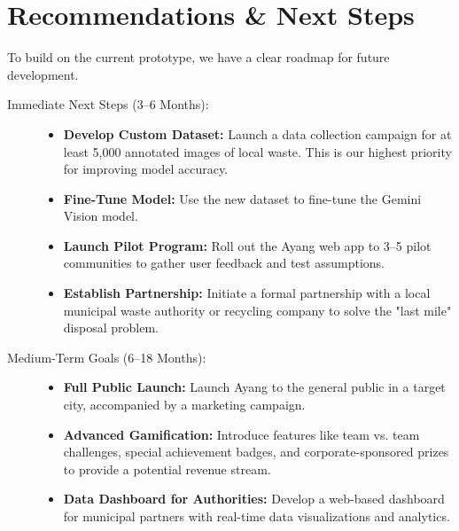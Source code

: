\chapter[Recommendations and Next Steps]{Recommendations \& Next Steps}
\label{cp:Recommendations-and-Next-Steps}

{
  \parindent0pt
  To build on the current prototype, we have a clear roadmap for future development.

  \begin{description}
    \item[Immediate Next Steps (3--6 Months):]

          \begin{itemize}
            \item \textbf{Develop Custom Dataset:} Launch a data collection campaign for at least 5,000 annotated images of local waste. This is our highest priority for improving model accuracy.

            \item \textbf{Fine-Tune Model:} Use the new dataset to fine-tune the Gemini Vision model.

            \item \textbf{Launch Pilot Program:} Roll out the Ayang web app to 3--5 pilot communities to gather user feedback and test assumptions.

            \item \textbf{Establish Partnership:} Initiate a formal partnership with a local municipal waste authority or recycling company to solve the "last mile" disposal problem.
          \end{itemize}

    \item[Medium-Term Goals (6--18 Months):]

          \begin{itemize}
            \item \textbf{Full Public Launch:} Launch Ayang to the general public in a target city, accompanied by a marketing campaign.

            \item \textbf{Advanced Gamification:} Introduce features like team vs. team challenges, special achievement badges, and corporate-sponsored prizes to provide a potential revenue stream.

            \item \textbf{Data Dashboard for Authorities:} Develop a web-based dashboard for municipal partners with real-time data visualizations and analytics.
          \end{itemize}


\end{description}}
